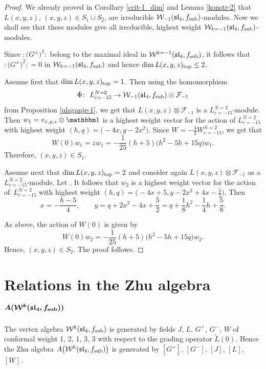 \documentclass[pdftex]{sigma}
\numberwithin{equation}{section}
\newcommand{\F}{\mathcal F}
\begin{document}
\begin{proof}
We already proved in Corollary \ref{crit-1_dim} and Lemma \ref{konstr-2} that $L(x,y,z)$, $(x,y,z) \in S_1 \cup S_2$, are irreducible $\mathcal{W}_{-1}(\mathfrak{sl}_4, f_{\rm sub})$-modules. Now we shall see that these modules give all irreducible, highest weight $\mathcal{W}_{k=-1}(\mathfrak{sl}_4, f_{\rm sub})$-modules.

Since ${:}\bigl(G^{\pm}\bigr)^2{:}$ belong to the maximal ideal in $\mathcal{W}^{k=-1}(\mathfrak{sl}_4, f_{\rm sub})$, it follows that ${:}\bigl(G^{\pm}\bigr) ^2{:} =0$ in $\mathcal{W}_{k=-1}(\mathfrak{sl}_4, f_{\rm sub})$ and hence $\dim L(x,y,z)_{\rm top} \le 2$.

Assume first that $\dim L(x,y,z)_{\rm top} = 1$. Then using the homomorphism
\[
\Phi\colon\ L^{N=2}_{c=-15} \rightarrow \mathcal{W}_{-1}(\mathfrak{sl}_4, f_{\rm sub}) \otimes \F_{-1}
\]
 from Proposition \ref{ulaganje-1}, we get that $L(x,y,z) \otimes \F_{-1}$ is a $L^{N=2}_{c=-15}$-module. Then $w_1 = v_{x,y,z} \otimes {\mathbbm 1}$ is a highest weight vector for the action of $ L^{N=2}_{c=-15}$ with highest weight $ (h,q) = \bigl(-4 x, y -2 x^2\bigr)$. Since $W = -\frac{3}{2} W^{N=2}_{c=-15} $, we get that
\[
W(0) w_1 = zw_1= -\frac{1}{25} (h+5) \bigl(h^2 - 5h + 15 q\bigr) w_1.
\]
 Therefore, $(x,y,z) \in S_1$.

Assume next that $\dim L(x,y,z)_{\rm top} = 2$ and consider again $L(x,y,z) \otimes \F_{-1}$ as a $L^{N=2}_{c=-15}$-module. Let . It follows that $w_2$ is a highest weight vector for the action of~$ L^{N=2}_{c=-15}$ with highest weight $ (h,q) = \bigl(-4 x+5, y -2 x^2 + 4 x - \frac{5}{2}\bigr)$. Then
\[
 x= -\frac{h-5}{4}, \qquad y = q+ 2x^2 - 4 x + \frac{5}{2} = q + \frac{1}{8} h^2 - \frac{1}{4} h + \frac{5}{8}.
 \]

As above, the action of $W(0)$ is given by
\[
W(0) w_2 = -\frac{1}{25} (h+5) \bigl(h^2 - 5h + 15 q\bigr) w_2.
\]
 Hence, $(x,y,z) \in S_2$.
The proof follows.
\end{proof}

 \appendix

\section[Relations in the Zhu algebra A(W\^{}k(sl\_4, f\_sub))]{Relations in the Zhu algebra $\boldsymbol{ A(\mathcal{W}^{k}(\mathfrak{sl}_4, f_{\rm sub}))}$}\label{appA}

The vertex algebra $\mathcal{W}^{k}(\mathfrak{sl}_4, f_{\rm sub})$ is generated by fields $J$, $L$, $G^+$, $G^-$, $W$ of conformal weight 1, 2, 1, 3, 3 with respect to the grading operator $\widetilde L(0)$.
	Hence the Zhu algebra $A\bigl(\mathcal{W}^{k}(\mathfrak{sl}_4, f_{\rm sub})\bigr)$ is generated by $ [G^+]$, $ [G^- ]$, $ [J ]$, $ [L]$, $ [W]$.
\end{document}
